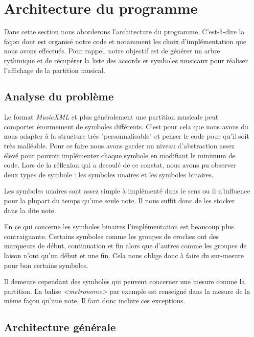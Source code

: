 \section{Architecture du programme}

\par
Dans cette section nous aborderons l'architecture du programme. C'est-à-dire la façon dont est organisé notre code et notamment les choix d’implémentation que nous avons effectués. Pour rappel, notre objectif est de générer un arbre rythmique et de récupérer la liste des accords et symboles musicaux pour réaliser l'affichage de la partition musical.

\subsection{Analyse du problème}

\par
Le format \emph{MusicXML} et plus généralement une partition musicale peut comporter énormement de symboles différents. C'est pour cela que nous avons du nous adapter à la structure très "personnalisable" et penser le code pour qu'il soit très malléable. Pour ce faire nous avons garder un niveau d'abstraction assez élevé pour pouvoir implémenter chaque symbole en modifiant le minimum de code. Lors de la réflexion qui a decoulé de ce constat, nous avons pu observer deux types de symbole : les symboles unaires et les symboles binaires.
\par
Les symboles unaires sont assez simple à implémenté dans le sens ou il n'influence pour la plupart du temps qu'une seule note. Il nous suffit donc de les stocker dans la dite note.
\par
En ce qui concerne les symboles binaires l'implémentation est beaucoup plus contraignante. Certains symboles comme les groupes de croches ont des marqueurs de début, continuation et fin alors que d'autres comme les groupes de laison n'ont qu'un début et une fin. Cela nous oblige donc à faire du sur-mesure pour bon certains symboles.
\par
Il demeure cependant des symboles qui peuvent concerner une mesure comme la partition. La balise \emph{<metronome>} par exemple est renseigné dans la mesure de la même  façon qu'une note. Il faut donc inclure ces exceptions.


\subsection{Architecture générale}

